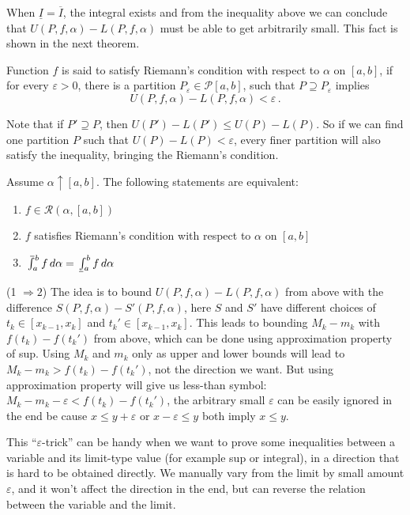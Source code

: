\documentclass{article}
\newcommand{\upI}{\overline{I}}
\newcommand{\lowI}{\underline{I}}
\newcommand{\Riemann}{\mathcal R}
\newcommand{\Partition}{\mathcal P}
\newcommand{\finer}{\supseteq}
\newcommand{\dd}{\mathop{}\!d}
\newcommand{\increasing}{\uparrow}
\def\upint{\mathchoice%
    {\mkern13mu\overline{\vphantom{\intop}\mkern7mu}\mkern-20mu}%
    {\mkern7mu\overline{\vphantom{\intop}\mkern7mu}\mkern-14mu}%
    {\mkern7mu\overline{\vphantom{\intop}\mkern7mu}\mkern-14mu}%
    {\mkern7mu\overline{\vphantom{\intop}\mkern7mu}\mkern-14mu}%
  \int}
\def\lowint{\mkern3mu\underline{\vphantom{\intop}\mkern7mu}\mkern-10mu\int}
\begin{document}
When $ \lowI = \upI $, the integral exists and from the inequality above we can conclude that $ U(P, f, \alpha) - L(P, f, \alpha) $ must be able to get arbitrarily small. This fact is shown in the next theorem.


\begin{definition}
    Function $ f $ is said to satisfy Riemann's condition with respect to $ \alpha $ on $ [a, b] $, if for every $ \varepsilon > 0 $, there is a partition $ P_\varepsilon \in \Partition[a, b] $, such that $ P \finer P_\varepsilon $ implies \[ U(P, f, \alpha) - L(P, f, \alpha) < \varepsilon \,. \]
\end{definition}

Note that if $ P' \finer P $, then $ U(P') - L(P') \leqslant U(P) - L(P) $. So if we can find one partition $ P $ such that $ U(P) - L(P) < \varepsilon $, every finer partition will also satisfy the inequality, bringing the Riemann's condition.

\begin{theorem}
    Assume $ \alpha \increasing [a, b] $. The following statements are equivalent:
    \begin{enumerate}
        \item $ f \in \Riemann(\alpha, [a, b]) $
        \item $ f $ satisfies Riemann's condition with respect to $ \alpha $ on $ [a, b] $
        \item $ \upint_a^b f \dd \alpha = \lowint_a^b f \dd \alpha $
    \end{enumerate}
\end{theorem}

(1 $ \Rightarrow 2 $) The idea is to bound $ U(P, f, \alpha) - L(P, f, \alpha) $ from above with the difference $ S(P, f, \alpha) - S'(P, f, \alpha) $, here $ S $ and $ S' $ have different choices of $ t_k \in [x_{k - 1}, x_k] $ and $ t_k' \in [x_{k-1}, x_k] $. This leads to bounding $ M_k - m_k $ with $ f(t_k) - f(t_k') $ from above, which can be done using approximation property of sup. Using $ M_k $ and $ m_k $ only as upper and lower bounds will lead to $ M_k - m_k > f(t_k) - f(t_k') $, not the direction we want. But using approximation property will give us less-than symbol: $ M_k - m_k - \varepsilon < f(t_k) - f(t_k') $, the arbitrary small $ \varepsilon $ can be easily ignored in the end be cause $ x \leqslant y + \varepsilon $ or $ x - \varepsilon \leqslant y $ both imply $ x \leqslant y $.

This ``$ \varepsilon $-trick'' can be handy when we want to prove some inequalities between a variable and its limit-type value (for example sup or integral), in a direction that is hard to be obtained directly. We manually vary from the limit by small amount $ \varepsilon $, and it won't affect the direction in the end, but can reverse the relation between the variable and the limit.
\end{document}
